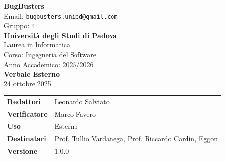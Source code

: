 \documentclass[a4paper,12pt]{article}
\newcommand{\CurrentVersion}{1.0.0}
\begin{document}
\begin{center}  
  
  {\Large\bfseries\color{primaryblue} BugBusters}\\[0.3cm]
  {\small\color{darkgray} Email: \texttt{bugbusters.unipd@gmail.com}} \\[0.1cm]
  {\small\color{darkgray} Gruppo: 4} \\[0.5cm]

  {\large\bfseries Università degli Studi di Padova}\\[0.3cm]
  {\small Laurea in Informatica}\\[0.2cm]
  {\small Corso: Ingegneria del Software}\\[0.2cm]
  {\small Anno Accademico: 2025/2026}\\[0.8cm]

  {\Huge\bfseries\color{primaryblue} Verbale Esterno}\\[0.3cm]
  {\Large\color{secondaryblue} 24 ottobre 2025}\\[0.8cm]
\end{center}

\begin{center}
\begin{tcolorbox}[colback=lightgray,colframe=primaryblue,width=0.85\textwidth,arc=3mm,boxrule=0.5pt]
\begin{tabular}{@{}ll@{}}
\textbf{Redattori}    & Leonardo Salviato \\
\textbf{Verificatore}    & Marco Favero \\
\textbf{Uso}          & Esterno \\
\textbf{Destinatari}  & Prof. Tullio Vardanega, Prof. Riccardo Cardin, Eggon \\
\textbf{Versione} & \CurrentVersion \\

\end{tabular}
\end{tcolorbox}
\end{center}
\end{document}
